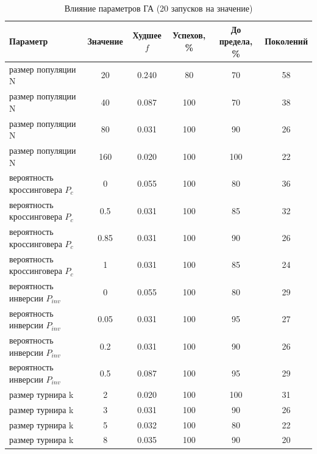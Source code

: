 \begin{table}[H]
\caption{Влияние параметров ГА (20 запусков на значение)}
\label{tab:params}
\centering
\small
\begin{tabular}{lccccc}
\toprule
Параметр & Значение & Худшее $f$ & Успехов, \% & До предела, \% & Поколений \\
\midrule
размер популяции N & 20 & 0.240 & 80 & 70 & 58 \\
размер популяции N & 40 & 0.087 & 100 & 70 & 38 \\
размер популяции N & 80 & 0.031 & 100 & 90 & 26 \\
размер популяции N & 160 & 0.020 & 100 & 100 & 22 \\
вероятность кроссинговера $P_c$ & 0 & 0.055 & 100 & 80 & 36 \\
вероятность кроссинговера $P_c$ & 0.5 & 0.031 & 100 & 85 & 32 \\
вероятность кроссинговера $P_c$ & 0.85 & 0.031 & 100 & 90 & 26 \\
вероятность кроссинговера $P_c$ & 1 & 0.031 & 100 & 85 & 24 \\
вероятность инверсии $P_{inv}$ & 0 & 0.055 & 100 & 80 & 29 \\
вероятность инверсии $P_{inv}$ & 0.05 & 0.031 & 100 & 95 & 27 \\
вероятность инверсии $P_{inv}$ & 0.2 & 0.031 & 100 & 90 & 26 \\
вероятность инверсии $P_{inv}$ & 0.5 & 0.087 & 100 & 95 & 29 \\
размер турнира k & 2 & 0.020 & 100 & 100 & 31 \\
размер турнира k & 3 & 0.031 & 100 & 90 & 26 \\
размер турнира k & 5 & 0.032 & 100 & 80 & 22 \\
размер турнира k & 8 & 0.035 & 100 & 90 & 20 \\
\bottomrule
\end{tabular}
\end{table}
